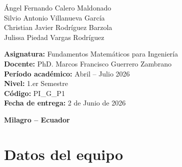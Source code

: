 \documentclass[12pt,a4paper]{article}
\begin{document}
\begin{titlepage}
\begin{minipage}{0.95\textwidth}
			{\Large\color{azulUNEMI}
				\hspace*{1cm}Ángel Fernando Calero Maldonado\\
				\hspace*{1cm}Silvio Antonio Villanueva García\\
				\hspace*{1cm}\color{azulUNEMI}Christian Javier Rodríguez Barzola\\
				\hspace*{1cm}\color{azulUNEMI}Julissa Piedad Vargas Rodríguez}
			
			\vspace{1.2cm}
			
			{\Large\color{naranjaUNEMI}
				\textbf{Asignatura:}}
			{\Large\color{azulUNEMI} Fundamentos Matemáticos para Ingeniería}\\
			
			{\Large\color{naranjaUNEMI}
				\textbf{Docente:}}
			{\Large\color{azulUNEMI} PhD. Marcos Francisco Guerrero Zambrano}\\
			
			{\Large\color{naranjaUNEMI}
				\textbf{Período académico:}}
			{\Large\color{azulUNEMI} Abril -- Julio 2026}\\
			
			{\Large\color{naranjaUNEMI}
				\textbf{Nivel:}}
			{\Large\color{azulUNEMI} 1.er Semestre}\\
			
			{\Large\color{naranjaUNEMI}
				\textbf{Código:}}
			{\Large\color{azulUNEMI} PI\_G\_P1}\\
			
			{\Large\color{naranjaUNEMI}
				\textbf{Fecha de entrega:}}
			{\Large\color{azulUNEMI} 2 de Junio de 2026}
			
		\end{minipage}
		
		\vfill
		
		{\large
			\color{azulUNEMI}
			\textbf{Milagro -- Ecuador}\par}
		
	\end{titlepage}

	\section*{Datos del equipo}
	
\end{document}
